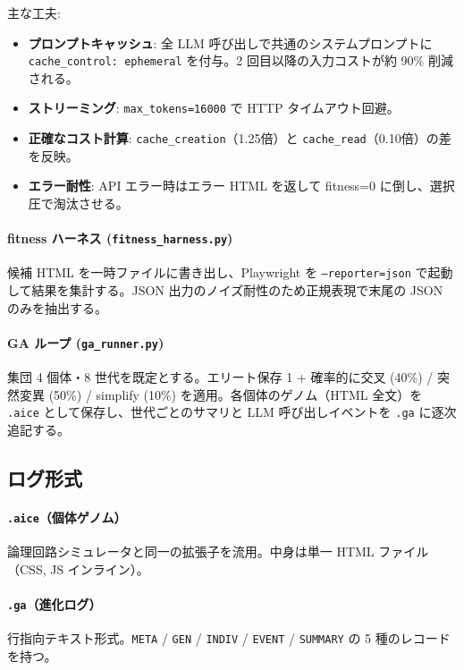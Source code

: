 \documentclass[a4paper,11pt]{ltjsarticle}
\begin{document}
主な工夫:
\begin{itemize}[leftmargin=2em,itemsep=2pt]
  \item \textbf{プロンプトキャッシュ}: 全 LLM 呼び出しで共通のシステムプロンプトに \texttt{cache\_control: ephemeral} を付与。2 回目以降の入力コストが約 90\% 削減される。
  \item \textbf{ストリーミング}: \texttt{max\_tokens=16000} で HTTP タイムアウト回避。
  \item \textbf{正確なコスト計算}: \texttt{cache\_creation}（1.25倍）と \texttt{cache\_read}（0.10倍）の差を反映。
  \item \textbf{エラー耐性}: API エラー時はエラー HTML を返して fitness=0 に倒し、選択圧で淘汰させる。
\end{itemize}

\paragraph{fitness ハーネス (\texttt{fitness\_harness.py})}
候補 HTML を一時ファイルに書き出し、Playwright を \texttt{--reporter=json} で起動して結果を集計する。JSON 出力のノイズ耐性のため正規表現で末尾の JSON のみを抽出する。

\paragraph{GA ループ (\texttt{ga\_runner.py})}
集団 4 個体・8 世代を既定とする。エリート保存 1 + 確率的に交叉 (40\%) / 突然変異 (50\%) / simplify (10\%) を適用。各個体のゲノム（HTML 全文）を \texttt{.aice} として保存し、世代ごとのサマリと LLM 呼び出しイベントを \texttt{.ga} に逐次追記する。

\subsection{ログ形式}

\paragraph{\texttt{.aice}（個体ゲノム）}
論理回路シミュレータと同一の拡張子を流用。中身は単一 HTML ファイル（CSS, JS インライン）。

\paragraph{\texttt{.ga}（進化ログ）}
行指向テキスト形式。\texttt{META} / \texttt{GEN} / \texttt{INDIV} / \texttt{EVENT} / \texttt{SUMMARY} の 5 種のレコードを持つ。
\end{document}
